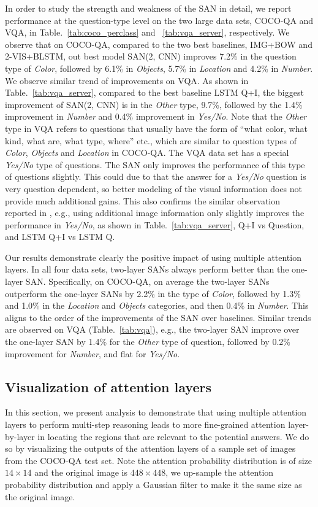\documentclass[10pt,twocolumn,letterpaper]{article}
\begin{document}
In order to study the strength and weakness of the SAN in detail, we report
performance at the question-type level on the two large data sets, COCO-QA and
VQA, in Table.~\ref{tab:coco_perclass} and ~\ref{tab:vqa_server},
respectively. We observe that on COCO-QA, compared to the two best baselines,
IMG+BOW and 2-VIS+BLSTM, out best model SAN(2, CNN) improves 7.2\% in the
question type of \emph{Color}, followed by 6.1\% in \emph{Objects}, 5.7\% in
\emph{Location} and 4.2\% in \emph{Number}. We observe similar trend of
improvements on VQA. As shown in Table.~\ref{tab:vqa_server}, compared to the
best baseline LSTM Q+I, the biggest improvement of SAN(2, CNN) is in the
\emph{Other} type, 9.7\%, followed by the 1.4\% improvement in \emph{Number}
and 0.4\% improvement in \emph{Yes/No}. Note that the \emph{Other} type in VQA
refers to questions that usually have the form of ``what color, what kind, what
are, what type, where'' etc., which are similar to question types of
\emph{Color}, \emph{Objects} and \emph{Location} in COCO-QA. The VQA data set
has a special \emph{Yes/No} type of questions. The SAN only improves the
performance of this type of questions slightly. This could due to that the
answer for a \emph{Yes/No} question is very question dependent, so better
modeling of the visual information does not provide much additional gains. This
also confirms the similar observation reported in \cite{antol2015vqa}, e.g.,
using additional image information only slightly improves the performance in
\emph{Yes/No}, as shown in Table.~\ref{tab:vqa_server}, Q+I vs Question, and
LSTM Q+I vs LSTM Q.

Our results demonstrate clearly the positive impact of using multiple attention
layers. In all four data sets, two-layer SANs always perform better than the
one-layer SAN. Specifically, on COCO-QA, on average the two-layer SANs
outperform the one-layer SANs by 2.2\% in the type of \emph{Color}, followed by
1.3\% and 1.0\% in the \emph{Location} and \emph{Objects} categories, and then
0.4\% in \emph{Number}. This aligns to the order of the improvements of the SAN
over baselines. Similar trends are observed on VQA (Table.~\ref{tab:vqa}),
e.g., the two-layer SAN improve over the one-layer SAN by 1.4\% for the
\emph{Other} type of question, followed by 0.2\% improvement for \emph{Number},
and flat for \emph{Yes/No}.


\subsection{Visualization of attention layers}
In this section, we present analysis to demonstrate that using multiple
attention layers to perform multi-step reasoning leads to more fine-grained
attention layer-by-layer in locating the regions that are relevant to the
potential answers. We do so by visualizing the outputs of the attention layers
of a sample set of images from the COCO-QA test set. Note the attention
probability distribution is of size $14\times 14$ and the original image is
$448\times448$, we up-sample the attention probability distribution and apply a
Gaussian filter to make it the same size as the original image.
\end{document}
